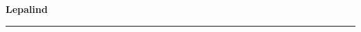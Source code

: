 \documentclass[10pt]{book}
\begin{document}
{
  \samepage
  \raggedbottom
  \raggedright
  \sloppy


  \vspace{0.2in}

  \noindent\begin{minipage}{.1\textwidth}
    \hfill\vspace{0.1in}
  \end{minipage}%
  \noindent\begin{minipage}{.8\textwidth}
    \centering
    \bfseries
    \large Lepalind
  \end{minipage}%
  \noindent\begin{minipage}{.1\textwidth}
      \hfill\vspace{0.1in}
  \end{minipage}

  \nopagebreak[4]
  \vspace{0.1in}
  \nopagebreak[4]
  \hrule height 0.05ex
  \nopagebreak[4]
  \vspace{-0.05in}




}
\end{document}

